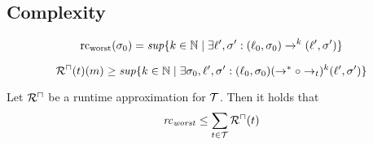 \subsection{Complexity}

\begin{definition}
	\[ \text{rc}_{\text{worst}}(\sigma_0) = \mathit{sup} \lbrace  k \in \mathbb{N} \mid \exists \ell', \sigma': (\ell_0, \sigma_0) \rightarrow^k (\ell', \sigma')  \rbrace \]
\end{definition}

\begin{definition}
	\[ {\mathcal{R}^\sqcap}(t)(m) \geq \mathit{sup} \lbrace  k \in \mathbb{N} \mid \exists \sigma_0, \ell', \sigma': (\ell_0, \sigma_0) (\rightarrow^* \circ \rightarrow_t)^k (\ell', \sigma')  \rbrace \]
\end{definition}

\begin{theorem}
	Let ${\mathcal{R}^\sqcap}$ be a runtime approximation for $\mathcal{T}$.
	Then it holds that 
	\[ \mathit{rc}_\mathit{worst} \leq \sum_{t \in \mathcal{T}}{\mathcal{R}^\sqcap}(t) \]
\end{theorem}

